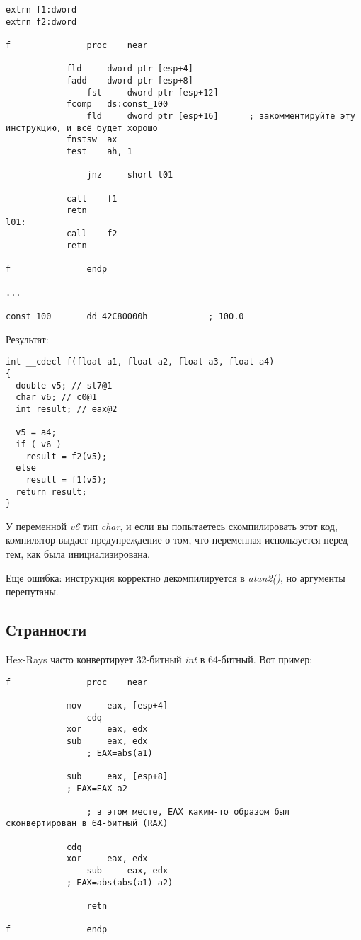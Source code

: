 \begin{lstlisting}[style=customasmx86]
extrn f1:dword
extrn f2:dword

f               proc    near

	        fld     dword ptr [esp+4]
        	fadd    dword ptr [esp+8]
                fst     dword ptr [esp+12]
	        fcomp   ds:const_100
                fld     dword ptr [esp+16]      ; закомментируйте эту инструкцию, и всё будет хорошо
	        fnstsw  ax
        	test    ah, 1

                jnz     short l01

	        call    f1
        	retn
l01:
	        call    f2
        	retn

f               endp

...

const_100       dd 42C80000h            ; 100.0
\end{lstlisting}

Результат:

\begin{lstlisting}[style=customc]
int __cdecl f(float a1, float a2, float a3, float a4)
{
  double v5; // st7@1
  char v6; // c0@1
  int result; // eax@2

  v5 = a4;
  if ( v6 )
    result = f2(v5);
  else
    result = f1(v5);
  return result;
}
\end{lstlisting}

У переменной \emph{v6} тип \emph{char}, и если вы попытаетесь скомпилировать этот код, компилятор выдаст предупреждение о том,
что переменная используется перед тем, как была инициализирована.

Еще ошибка: инструкция  корректно декомпилируется в \emph{atan2()}, но аргументы перепутаны.

\subsection{Странности}

Hex-Rays часто конвертирует 32-битный \emph{int} в 64-битный.
Вот пример:

\begin{lstlisting}[style=customasmx86]
f               proc    near

	        mov     eax, [esp+4]
                cdq
	        xor     eax, edx
        	sub     eax, edx
                ; EAX=abs(a1)

	        sub     eax, [esp+8]
        	; EAX=EAX-a2

                ; в этом месте, EAX каким-то образом был сконвертирован в 64-битный (RAX)

	        cdq
        	xor     eax, edx
                sub     eax, edx
	        ; EAX=abs(abs(a1)-a2)

                retn

f               endp
\end{lstlisting}

